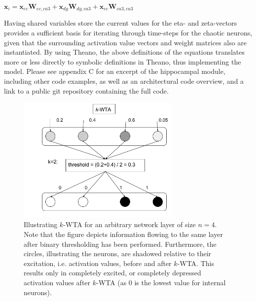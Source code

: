 \begin{center}
\begin{math}
    \textbf{x}_i = \textbf{x}_{ec} \textbf{W}_{ec, ca3} + \textbf{x}_{dg} \textbf{W}_{dg, ca3} + \textbf{x}_{ec} \textbf{W}_{ca3, ca3}
\end{math}
\end{center}

Having shared variables store the current values for the eta- and zeta-vectors provides a sufficient basis for iterating through time-steps for the chaotic neurons, given that the surrounding activation value vectors and weight matrices also are instantiated. By using Theano, the above definitions of the equations translates more or less directly to symbolic definitions in Theano, thus implementing the model. Please see appendix C for an excerpt of the hippocampal module, including other code examples, as well as an architectural code overview, and a link to a public git repository containing the full code.

\begin{figure}
    \centering
    \includegraphics[width=8cm]{fig/kWTA}
    \caption{Illustrating $k$-WTA for an arbitrary network layer of size $n=4$. Note that the figure depicts information flowing to  the same layer after binary thresholding has been performed. Furthermore, the circles, illustrating the neurons, are shadowed relative to their excitation, i.e. activation values, before and after $k$-WTA. This results only in completely excited, or completely depressed activation values after $k$-WTA (as 0 is the lowest value for internal neurons).}
    \label{fig:k_WTA_illustration}
\end{figure}

